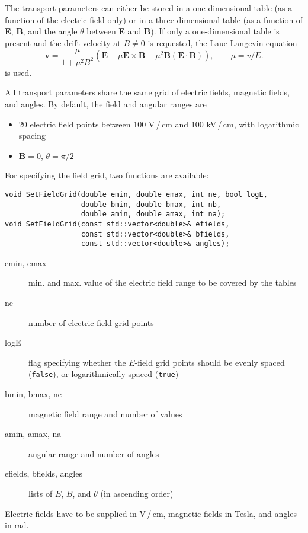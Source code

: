 The transport parameters can either be stored in a 
one-dimensional table (as a function of the electric field only) or 
in a three-dimensional table (as a function of \textbf{E}, \textbf{B}, 
and the angle \(\theta\) between \textbf{E} and \textbf{B}). 
If only a one-dimensional table is present and the 
drift velocity at \(B \ne 0\) is requested, the Laue-Langevin equation
\cite{BlumRieglerRolandi2008}
\begin{equation*}
  \mathbf{v} = \frac{\mu}{1 + \mu^2 B^2} \left(
  \mathbf{E} + \mu \mathbf{E} \times \mathbf{B} + 
  \mu^2 \mathbf{B} \left(\mathbf{E} \cdot \mathbf{B}\right)\right), \qquad 
  \mu = v / E. 
\end{equation*} 
is used. 

All transport parameters share the same grid 
of electric fields, magnetic fields, and angles.
By default, the field and angular ranges are
\begin{itemize}
  \item
  20 electric field points between 100 V\,/\,cm and 100 kV\,/\,cm, 
  with logarithmic spacing
  \item
  \(\mathbf{B} = 0\), \(\theta = \pi / 2\)
\end{itemize}

For specifying the field grid, two functions are available:
\begin{lstlisting}
void SetFieldGrid(double emin, double emax, int ne, bool logE,
                  double bmin, double bmax, int nb,
                  double amin, double amax, int na);
void SetFieldGrid(const std::vector<double>& efields,
                  const std::vector<double>& bfields,
                  const std::vector<double>& angles);
\end{lstlisting}
\begin{description}
\item[emin, emax] min. and max. value of the electric field range to be covered by the tables
\item[ne] number of electric field grid points
\item[logE] flag specifying whether the \(E\)-field grid points should be 
evenly spaced (\texttt{false}), or logarithmically spaced (\texttt{true}) 
\item[bmin, bmax, ne] magnetic field range and number of values
\item[amin, amax, na] angular range and number of angles
\item[efields, bfields, angles] lists of \(E\), \(B\), and 
\(\theta\) (in ascending order)
\end{description}
Electric fields have to be supplied in V\,/\,cm, magnetic fields in Tesla, 
and angles in rad.

